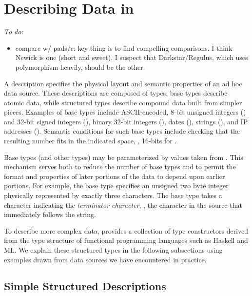 \newcommand{\pvalue}{???}
\section{Describing Data in \padsmlbig{}}
\label{sec:padsml-overview}

{\em
To do:
\begin{itemize}
\item compare w/ pads/c: key thing is to find compelling
  comparisons. I think Newick is one (short and sweet). I suspect that
  Darkstar/Regulus, which uses polymorphism heavily, should be the other.
\end{itemize}
}

A \padsml{} description specifies the physical layout and semantic
properties of an ad hoc data source.  These descriptions are composed
of types: base types describe atomic data, while structured types
describe compound data built from simpler pieces.  Examples of base
types include ASCII-encoded, 8-bit unsigned integers () and
32-bit signed integers (), binary 32-bit integers (),
dates (), strings (), and IP addresses
().  Semantic conditions for such base types include checking
that the resulting number fits in the indicated space, \ie, 16-bits
for .

Base types (and other types) may be parameterized by values taken from
\ml{}.  This mechanism serves both to reduce the number of base types
and to permit the format and properties of later portions of the data
to depend upon earlier portions.  For example, the base type
 specifies an unsigned two byte integer physically
represented by exactly three characters. The base type 
takes a character indicating the \textit{terminator character}, \ie{},
the character in the source that immediately follows the string.

To describe more complex data, \padsml{} provides a collection of
type constructors derived from the type structure of functional
programming languages such as Haskell and ML.  We explain these
structured types in the following subsections using examples drawn
from data sources we have encountered in practice. 


\subsection{Simple Structured Descriptions}


